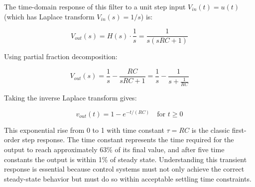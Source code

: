 \begin{example}
The time-domain response of this filter to a unit step input $V_{in}(t) = u(t)$ (which has Laplace transform $V_{in}(s) = 1/s$) is:

\begin{equation}
V_{out}(s) = H(s) \cdot \frac{1}{s} = \frac{1}{s(sRC + 1)}
\end{equation}

Using partial fraction decomposition:

\begin{equation}
V_{out}(s) = \frac{1}{s} - \frac{RC}{sRC + 1} = \frac{1}{s} - \frac{1}{s + \frac{1}{RC}}
\end{equation}

Taking the inverse Laplace transform gives:

\begin{equation}
v_{out}(t) = 1 - e^{-t/(RC)} \quad \text{for } t \geq 0
\end{equation}

This exponential rise from 0 to 1 with time constant $\tau = RC$ is the classic first-order step response. The time constant represents the time required for the output to reach approximately 63\% of its final value, and after five time constants the output is within 1\% of steady state. Understanding this transient response is essential because control systems must not only achieve the correct steady-state behavior but must do so within acceptable settling time constraints.
\end{example}


